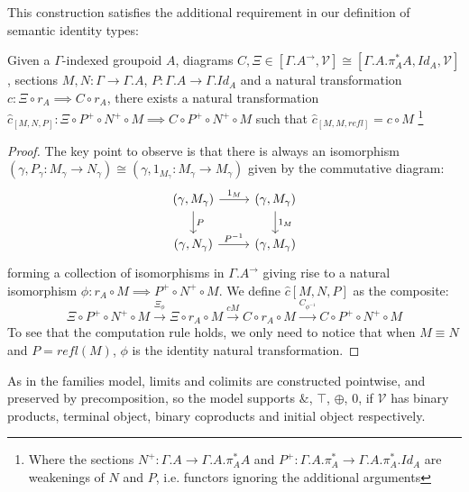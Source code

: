 \documentclass[a4paper,english]{lipics-v2018}
\begin{document}
This construction satisfies the additional requirement in our definition of semantic identity types:
\begin{theorem}Given a $\Gamma$-indexed groupoid $A$, diagrams $C, \Xi \in [\Gamma.A^\to, \mathcal{V}] \cong [\Gamma.A.\pi_A^*A,Id_A, \mathcal{V}]$, sections $M, N : \Gamma \to \Gamma.A$, $P : \Gamma.A \to \Gamma.Id_A$ and a natural transformation $c : \Xi \circ r_A \implies C\circ r_A$, there exists a natural transformation $\hat c_{[M,N,P]} : \Xi \circ P^+ \circ N^+ \circ M \implies C \circ P^+ \circ N^+ \circ M$ such that $\hat c_{[M,M,refl]} = c \circ M$ \footnote{Where the sections $N^+ : \Gamma.A \to \Gamma.A.\pi_A^*A$ and $P^+ : \Gamma.A.\pi_A^* \to \Gamma.A.\pi_A^*.Id_A$ are weakenings of $N$ and $P$, i.e. functors ignoring the additional arguments}
  \begin{proof}
    The key point to observe is that there is always an isomorphism $(\gamma, P_\gamma : M_\gamma \to N_\gamma) \cong (\gamma, 1_{M_\gamma} : M_\gamma \to M_\gamma)$ given by the commutative diagram:
    \[
      \begin{tikzcd}
      (\gamma, M_\gamma) \ar[d, "P"] \ar[r, "1_M"] & (\gamma, M_\gamma) \ar[d, "1_M"]\\
      (\gamma, N_\gamma) \ar[r, "P^{-1}"] & (\gamma, M_\gamma)
      \end{tikzcd}
    \]
    forming a collection of isomorphisms in $\Gamma.A^\to$ giving rise to a natural isomorphism $\phi : r_A \circ M \implies P^+ \circ N^+ \circ M$. We define $\hat c[M,N,P]$ as the composite:
\[
\Xi \circ P^+ \circ N^+ \circ M \xrightarrow{\Xi_{\phi}} \Xi \circ r_A \circ M \xrightarrow{cM} C \circ r_A \circ M \xrightarrow{C_{\phi^{-1}}} C \circ P^+ \circ N^+ \circ M
\]
To see that the computation rule holds, we only need to notice that when $M \equiv N$ and $P = refl(M)$, $\phi$ is the identity natural transformation.
\end{proof}
\end{theorem}
As in the families model, limits and colimits are constructed pointwise, and preserved by precomposition, so the model supports $\&$, $\top$, $\oplus$, $0$, if $\mathcal{V}$ has binary products, terminal object, binary coproducts and initial object respectively.
\end{document}
